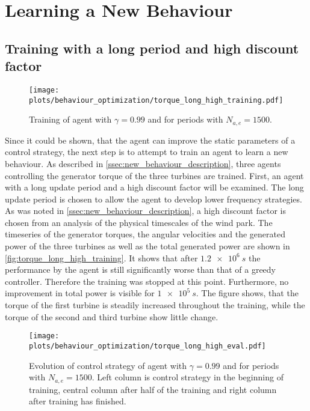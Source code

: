 \section{Learning a New Behaviour}
\subsection{Training with a long period and high discount factor}
\begin{figure}[h]
	\texttt{[image: plots/behaviour\_optimization/torque\_long\_high\_training.pdf]}
	\caption{ Training of agent with $\gamma=0.99$ and for periods with $N_{a,e}=1500$.}
	\label{fig:torque_long_high_training}
\end{figure} Since it could be shown, that the agent can improve the static parameters of a control strategy, the next step is to attempt to train an agent to learn a new behaviour. As described in \ref{ssec:new_behaviour_description}, three agents controlling the generator torque of the three turbines are trained. First, an agent with a long update period and a high discount factor will be examined. The long update period is chosen to allow the agent to develop lower frequency strategies. As was noted in \autoref{ssec:new_behaviour_description}, a high discount factor is chosen from an analysis of the physical timescales of the wind park. The timeseries of the generator torques, the angular velocities and the generated power of the three turbines as well as the total generated power are shown in \autoref{fig:torque_long_high_training}. It shows that after $\SI{1.2e6}{s}$ the performance by the agent is still significantly worse than that of a greedy controller. Therefore the training was stopped at this point. Furthermore, no improvement in total power is visible for $\SI{1e5}{s}$. The figure shows, that the torque of the first turbine is steadily increased throughout the training, while the torque of the second and third turbine show little change.
\begin{figure}[h]
	\texttt{[image: plots/behaviour\_optimization/torque\_long\_high\_eval.pdf]}
	\caption{ Evolution of control strategy of agent with $\gamma=0.99$ and for periods with $N_{a,e}=1500$. Left column is control strategy in the beginning of training, central column after half of the training and right column after training has finished.}
	\label{fig:torque_long_high_eval}
\end{figure} \\
